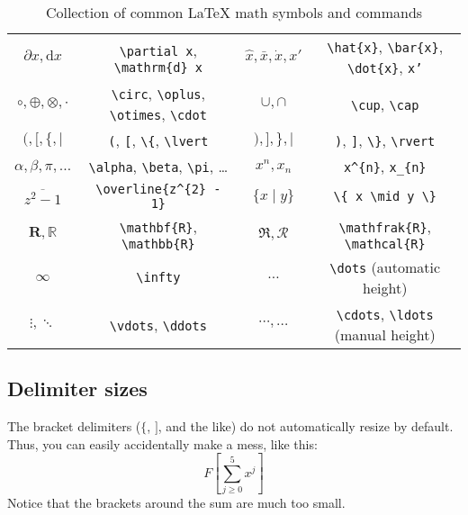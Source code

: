 \documentclass{article}
\newcommand*{\code}[1]{\texttt{#1}}
\begin{document}
\begin{table}[htb]
\begin{tabular}[htb]{c c c c}
  $\partial x, \mathrm{d} x$ & \code{\textbackslash{}partial x}, \code{\textbackslash{}mathrm\{d\} x} & $\hat{x}, \bar{x}, \dot{x}, x'$ & \code{\textbackslash{}hat\{x\}}, \code{\textbackslash{}bar\{x\}}, \code{\textbackslash{}dot\{x\}}, \code{x'} \\
  $\circ, \oplus, \otimes, \cdot$ & \code{\textbackslash{}circ}, \code{\textbackslash{}oplus}, \code{\textbackslash{}otimes}, \code{\textbackslash{}cdot} & $\cup, \cap$ & \code{\textbackslash{}cup}, \code{\textbackslash{}cap} \\
  $(, [, \{, \lvert$ & \code{(}, \code{[}, \code{\textbackslash{}\{}, \code{\textbackslash{}lvert} & $), ], \}, \rvert$ & \code{)}, \code{]}, \code{\textbackslash{}\}}, \code{\textbackslash{}rvert} \\
  $\alpha, \beta, \pi, \dots$ & \code{\textbackslash{}alpha}, \code{\textbackslash{}beta}, \code{\textbackslash{}pi}, \dots & $x^{n}, x_{n}$ & \code{x\textasciicircum{}\{n\}}, \code{x\_\{n\}} \\
  $\overline{z^{2} - 1}$ & \code{\textbackslash{}overline\{z\textasciicircum{}\{2\} - 1\}} & $\{ x \mid y \}$ & \code{\textbackslash{}\{ x \textbackslash{}mid y \textbackslash{}\}} \\
  $\mathbf{R}, \mathbb{R}$ & \code{\textbackslash{}mathbf\{R\}}, \code{\textbackslash{}mathbb\{R\}} & $\mathfrak{R}, \mathcal{R}$ & \code{\textbackslash{}mathfrak\{R\}}, \code{\textbackslash{}mathcal\{R\}} \\
  $\infty$ & \code{\textbackslash{}infty} & $\dots$ & \code{\textbackslash{}dots} (automatic height) \\
  $\vdots, \ddots$ & \code{\textbackslash{}vdots}, \code{\textbackslash{}ddots} & $\cdots, \ldots$ & \code{\textbackslash{}cdots}, \code{\textbackslash{}ldots} (manual height) \\
 \bottomrule
\end{tabular}
\caption{Collection of common \LaTeX{} math symbols and commands}
\label{tab:comsymb}
\end{table}

\subsection*{Delimiter sizes}
The bracket delimiters ($\{$, $]$, and the like) do not automatically resize by default.
Thus, you can easily accidentally make a mess, like this:
\begin{equation}
  \label{eq:brackexbad}
  F [ \sum_{j \geq 0}^{5} x^{j} ]
\end{equation}
Notice that the brackets around the sum are much too small.
\end{document}
